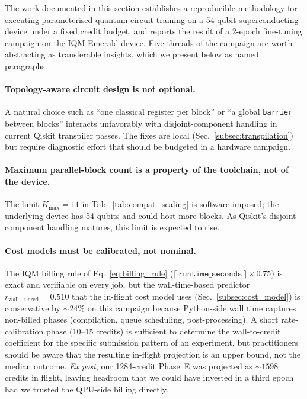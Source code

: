 The work documented in this section establishes a reproducible methodology for executing parameterised-quantum-circuit training on a 54-qubit superconducting device under a fixed credit budget, and reports the result of a 2-epoch fine-tuning campaign on the IQM Emerald device. Five threads of the campaign are worth abstracting as transferable insights, which we present below as named paragraphs.

\paragraph{Topology-aware circuit design is not optional.}
A natural choice such as ``one classical register per block'' or ``a global \texttt{barrier} between blocks'' interacts unfavorably with disjoint-component handling in current Qiskit transpiler passes. The fixes are local (Sec.~\ref{subsec:transpilation}) but require diagnostic effort that should be budgeted in a hardware campaign.

\paragraph{Maximum parallel-block count is a property of the toolchain, not of the device.}
The limit $K_{\max}=11$ in Tab.~\ref{tab:compat_scaling} is software-imposed; the underlying device has 54 qubits and could host more blocks. As Qiskit's disjoint-component handling matures, this limit is expected to rise.

\paragraph{Cost models must be calibrated, not nominal.}
The IQM billing rule of Eq.~\ref{eq:billing_rule} ($\lceil\,\texttt{runtime\_seconds}\,\rceil \times 0.75$) is exact and verifiable on every job, but the wall-time-based predictor $r_{\mathrm{wall}\to\mathrm{cred}}=0.510$ that the in-flight cost model uses (Sec.~\ref{subsec:cost_model}) is conservative by $\sim 24\%$ on this campaign because Python-side wall time captures non-billed phases (compilation, queue scheduling, post-processing). A short rate-calibration phase (10--15 credits) is sufficient to determine the wall-to-credit coefficient for the specific submission pattern of an experiment, but practitioners should be aware that the resulting in-flight projection is an upper bound, not the median outcome. \emph{Ex post}, our 1284-credit Phase~E was projected as $\sim 1598$ credits in flight, leaving headroom that we could have invested in a third epoch had we trusted the QPU-side billing directly.

